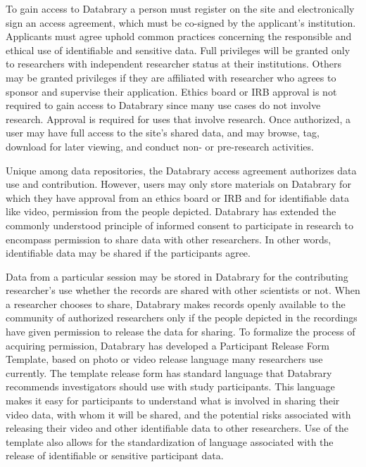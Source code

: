 \documentclass[letterpaper,man,apacite]{apa6}
\begin{document}
To gain access to Databrary a person must register on the site and electronically sign an access agreement, which must be co-signed by the applicant's institution. 
Applicants must agree uphold common practices concerning the responsible and ethical use of identifiable and sensitive data. 
Full privileges will be granted only to researchers with independent researcher status at their institutions. 
Others may be granted privileges if they are affiliated with researcher who agrees to sponsor and supervise their application.
Ethics board or IRB approval is not required to gain access to Databrary since many use cases do not involve research.
Approval is required for uses that involve research.
Once authorized, a user may have full access to the site's shared data, and may browse, tag, download for later viewing, and conduct non- or pre-research activities. 

Unique among data repositories, the Databrary access agreement authorizes data use and contribution.
However, users may only store materials on Databrary for which they have approval from an ethics board or IRB and for identifiable data like video, permission from the people depicted. 
Databrary has extended the commonly understood principle of informed consent to participate in research to encompass permission to share data with other researchers.
In other words, identifiable data may be shared if the participants agree. 

Data from a particular session may be stored in Databrary for the contributing researcher’s use whether the records are shared with other scientists or not. 
When a researcher chooses to share, Databrary makes records openly available to the community of authorized researchers only if the people depicted in the recordings have given permission to release the data for sharing. 
To formalize the process of acquiring permission, Databrary has developed a Participant Release Form Template, based on photo or video release language many researchers use currently. 
The template release form has standard language that Databrary recommends investigators should use with study participants. 
This language makes it easy for participants to understand what is involved in sharing their video data, with whom it will be shared, and the potential risks associated with releasing their video and other identifiable data to other researchers. 
Use of the template also allows for the standardization of language associated with the release of identifiable or sensitive participant data.
\end{document}
